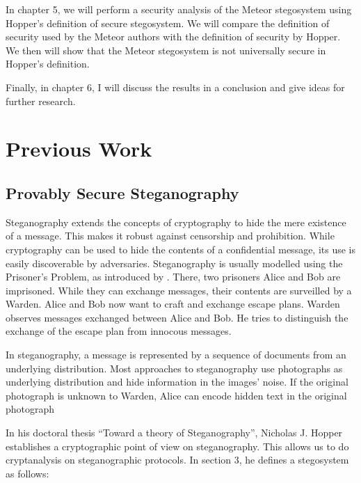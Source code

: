 \documentclass[english,version-2020-11]{uzl-thesis}
\begin{document}
In chapter 5, we will perform a security analysis of the Meteor stegosystem using Hopper's definition of secure stegosystem.
We will compare the definition of security used by the Meteor authors with the definition of security by Hopper.
We then will show that the Meteor stegosystem is not universally secure in Hopper's definition.

Finally, in chapter 6, I will discuss the results in a conclusion and give ideas for further research.

\chapter{Previous Work}

\section{Provably Secure Steganography}

Steganography extends the concepts of cryptography to hide the mere existence of a message.
This makes it robust against censorship and prohibition.
While cryptography can be used to hide the contents of a confidential message, its use is easily discoverable by adversaries.
Steganography is usually modelled using the Prisoner's Problem, as introduced by \cite{Simmons83}.
There, two prisoners Alice and Bob are imprisoned.
While they can exchange messages, their contents are surveilled by a Warden.
Alice and Bob now want to craft and exchange escape plans.
Warden observes messages exchanged between Alice and Bob.
He tries to distinguish the exchange of the escape plan from innocous messages.

In steganography, a message is represented by a sequence of documents from an underlying distribution.
Most approaches to steganography use photographs as underlying distribution and hide information in the images' noise.
If the original photograph is unknown to Warden, Alice can encode hidden text in the original photograph

In his doctoral thesis ``Toward a theory of Steganography'', Nicholas J. Hopper  establishes a cryptographic point of view on steganography. 
This allows us to do cryptanalysis on steganographic protocols.
In section 3, he defines a stegosystem as follows:
\end{document}
